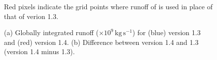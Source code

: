 \documentclass[dvipdfmx]{elsarticle_mod}
\begin{document}
\begin{figure}[h]
  \centering
  \caption{Red pixels indicate the grid points where runoff of \citet{Bamber_et_al_2018} is used in place of that of verion 1.3.}
  \label{fig:replace_with_bamber}
\end{figure}

\begin{figure}[h]
  \centering
  \caption{(a) Globally integrated runoff ($\times 10^{9}\,\mathrm{kg}\, \mathrm{s}^{-1}$) for (blue) version 1.3 and (red) version 1.4. (b) Difference between version 1.4 and 1.3 (version 1.4 minus 1.3).}
  \label{fig:runoff_comp_v1_3-v1_4}
\end{figure}
\end{document}

